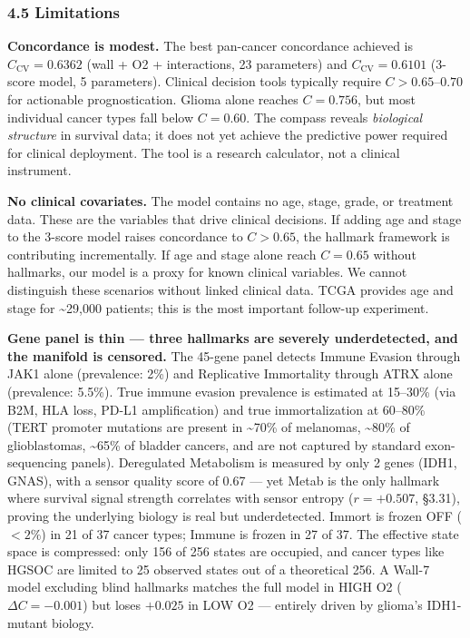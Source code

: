 \documentclass[
  11pt,
]{article}
\begin{document}
\subsubsection{4.5 Limitations}\label{limitations}

\textbf{Concordance is modest.} The best pan-cancer concordance achieved
is \(C_\mathrm{CV} = 0.6362\) (wall + O2 + interactions, 23 parameters)
and \(C_\mathrm{CV} = 0.6101\) (3-score model, 5 parameters). Clinical
decision tools typically require \(C > 0.65\)--\(0.70\) for actionable
prognostication. Glioma alone reaches \(C = 0.756\), but most individual
cancer types fall below \(C = 0.60\). The compass reveals
\emph{biological structure} in survival data; it does not yet achieve
the predictive power required for clinical deployment. The tool is a
research calculator, not a clinical instrument.

\textbf{No clinical covariates.} The model contains no age, stage,
grade, or treatment data. These are the variables that drive clinical
decisions. If adding age and stage to the 3-score model raises
concordance to \(C > 0.65\), the hallmark framework is contributing
incrementally. If age and stage alone reach \(C = 0.65\) without
hallmarks, our model is a proxy for known clinical variables. We cannot
distinguish these scenarios without linked clinical data. TCGA provides
age and stage for \textasciitilde29,000 patients; this is the most
important follow-up experiment.

\textbf{Gene panel is thin --- three hallmarks are severely
underdetected, and the manifold is censored.} The 45-gene panel detects
Immune Evasion through JAK1 alone (prevalence: 2\%) and Replicative
Immortality through ATRX alone (prevalence: 5.5\%). True immune evasion
prevalence is estimated at 15--30\% (via B2M, HLA loss, PD-L1
amplification) and true immortalization at 60--80\% (TERT promoter
mutations are present in \textasciitilde70\% of melanomas,
\textasciitilde80\% of glioblastomas, \textasciitilde65\% of bladder
cancers, and are not captured by standard exon-sequencing panels).
Deregulated Metabolism is measured by only 2 genes (IDH1, GNAS), with a
sensor quality score of 0.67 --- yet Metab is the only hallmark where
survival signal strength correlates with sensor entropy (\(r = +0.507\),
§3.31), proving the underlying biology is real but underdetected. Immort
is frozen OFF (\(< 2\%\)) in 21 of 37 cancer types; Immune is frozen in
27 of 37. The effective state space is compressed: only 156 of 256
states are occupied, and cancer types like HGSOC are limited to 25
observed states out of a theoretical 256. A Wall-7 model excluding blind
hallmarks matches the full model in HIGH O2 (\(\Delta C = -0.001\)) but
loses \(+0.025\) in LOW O2 --- entirely driven by glioma's IDH1-mutant
biology.
\end{document}
